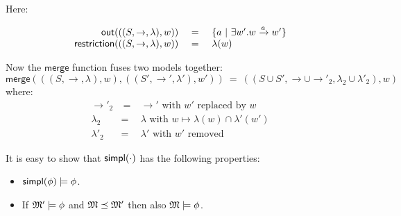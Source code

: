 \NI Here:

\[
\begin{array}{rcl}
  \mathsf{out}(((S,\rightarrow,\lambda),w)) 
     &\ =\ & \{ a \ | \  \exists w' . w \xrightarrow{a} w'\}  \\
  \mathsf{restriction}(((S,\rightarrow,\lambda),w)) 
    & = & 
  \lambda(w) 
\end{array}
\]

\NI Now the $\mathsf{merge}$ function fuses two  models together:
\[
   \mathsf{merge}( ( (S, \rightarrow, \lambda), w),  ( (S', \rightarrow', \lambda'), w')) 
      \ =\ 
   ((S \cup S', \rightarrow \cup \rightarrow'_2, \lambda_2 \cup \lambda'_2), w)
\]
where:
\begin{eqnarray*}
  \rightarrow'_2 &\ =\ & \rightarrow' \mbox{ with } w' \mbox{ replaced by } w  \\
  \lambda_2 & = & \lambda \mbox{ with } w \mapsto \lambda(w) \cap \lambda'(w')  \\
  \lambda'_2 & = & \lambda' \mbox{ with } w' \mbox{ removed } 
\end{eqnarray*}

\NI It is easy to show that $\mathsf{simpl}(\cdot)$ has the following properties:

\begin{itemize}

\item $\mathsf{simpl}(\phi) \models \phi$.

\item If $\frak{M}' \models \phi$ and  $\frak{M} \preceq \frak{M}'$ then also  $\frak{M} \models \phi$.
 
\end{itemize}

